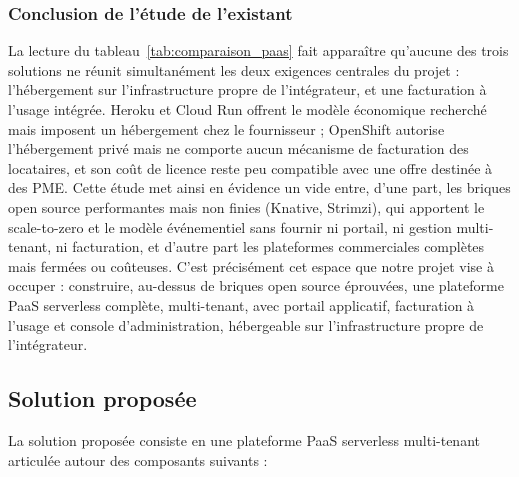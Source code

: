 \subsubsection*{Conclusion de l'étude de l'existant}
La lecture du tableau~\ref{tab:comparaison_paas} fait apparaître qu'aucune des trois solutions ne réunit simultanément les deux exigences centrales du projet : l'hébergement sur l'infrastructure propre de l'intégrateur, et une facturation à l'usage intégrée. Heroku et Cloud Run offrent le modèle économique recherché mais imposent un hébergement chez le fournisseur ; OpenShift autorise l'hébergement privé mais ne comporte aucun mécanisme de facturation des locataires, et son coût de licence reste peu compatible avec une offre destinée à des PME.
Cette étude met ainsi en évidence un vide entre, d'une part, les briques open source performantes mais non finies (Knative, Strimzi), qui apportent le scale-to-zero et le modèle événementiel sans fournir ni portail, ni gestion multi-tenant, ni facturation, et d'autre part les plateformes commerciales complètes mais fermées ou coûteuses. C'est précisément cet espace que notre projet vise à occuper : construire, au-dessus de briques open source éprouvées, une plateforme PaaS serverless complète, multi-tenant, avec portail applicatif, facturation à l'usage et console d'administration, hébergeable sur l'infrastructure propre de l'intégrateur.




\subsection{Solution proposée}

La solution proposée consiste en une plateforme PaaS serverless multi-tenant articulée autour des composants suivants :

